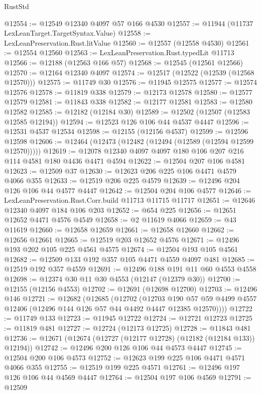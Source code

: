 \begin{lexlean}{RustStd}
\begin{coremodule}
@12554 := @12549 @12340 @4097 @57 @166 @4530
@12557 := @11944 (@11737 LexLeanTarget.TargetSyntax.Value)
@12558 := LexLeanPreservation.Rust.litValue
@12560 := @12557 (@12558 @4530)
@12561 := @12554 @12560
@12563 := LexLeanPreservation.Rust.typedLit @11713
@12566 := @12188 (@12563 @166 @57)
@12568 := @12545 (@12561 @12566)
@12570 := @12164 @12340 @4097
@12574 := @12517 (@12522 (@12539 (@12568 @12570)))
@12575 := @11749 @30
@12576 := @11945 @12575
@12577 := @12574 @12576
@12578 := @11819 @338
@12579 := @12173 @12578
@12580 := @12577 @12579
@12581 := @11843 @338
@12582 := @12177 @12581
@12583 := @12580 @12582
@12585 := @12182 (@12184 @30)
@12589 := @12502 (@12507 (@12583 @12585 @12194))
@12594 := @12523 @126 @106 @44 @4537 @4447
@12596 := @12531 @4537 @12534
@12598 := @12155 (@12156 @4537)
@12599 := @12596 @12598
@12606 := @12464 (@12473 (@12482 (@12494 (@12589 (@12594 @12599 @12570)))))
@12619 := @12078 @12340 @4097 @4097 @180 @106 @207 @216 @114 @4581 @180 @4436 @4471 @4594
@12622 := @12504 @207 @106 @4581
@12623 := @12509 @37
@12630 := @12623 @206 @225 @106 @4471 @4579 @4066 @355
@12633 := @12519 @206 @225 @4579
@12639 := @12496 @204 @126 @106 @44 @4577 @4447
@12642 := @12504 @204 @106 @4577
@12646 := LexLeanPreservation.Rust.Corr.build @11713 @11715 @11717
@12651 := @12646 @12340 @4097 @184 @106 @203
@12652 := @654 @225
@12656 := @12651 @12652 @4471 @4576 @4549
@12658 := @2 @11619 @4066
@12659 := @43 @11619
@12660 := @12658 @12659
@12661 := @12658 @12660
@12662 := @12656 @12661
@12665 := @12519 @203 @12652 @4576
@12671 := @12496 @193 @202 @105 @225 @4561 @4575
@12674 := @12504 @193 @105 @4561
@12682 := @12509 @133 @192 @357 @105 @4471 @4559 @4097 @481
@12685 := @12519 @192 @357 @4559
@12691 := @12496 @188 @191 @11 @60 @4553 @4558
@12698 := @12374 @30 @11 @30 @4553 (@12147 (@12379 @30))
@12700 := @12155 (@12156 @4553)
@12702 := @12691 (@12698 @12700)
@12703 := @12496 @146
@12721 := @12682
    (@12685
      (@12702
        (@12703
          @190
          @57
          @59
          @4499
          @4557
          @12406
          (@12496 @144 @126 @57 @44 @4492 @4447 @12385 @12570))))
@12722 := @11749 @133
@12723 := @11945 @12722
@12724 := @12721 @12723
@12725 := @11819 @481
@12727 := @12724 (@12173 @12725)
@12728 := @11843 @481
@12736 := @12671 (@12674 (@12727 (@12177 @12728) (@12182 (@12184 @133)) @12194))
@12742 := @12496 @200 @126 @106 @44 @4573 @4447
@12745 := @12504 @200 @106 @4573
@12752 := @12623 @199 @225 @106 @4471 @4571 @4066 @355
@12755 := @12519 @199 @225 @4571
@12761 := @12496 @197 @126 @106 @44 @4569 @4447
@12764 := @12504 @197 @106 @4569
@12791 := @12509

\end{coremodule}
\end{lexlean}
